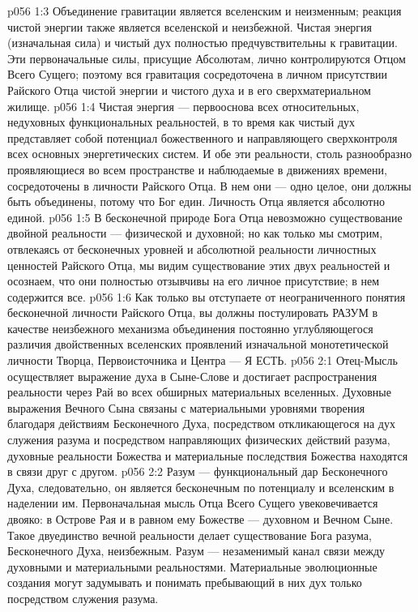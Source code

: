 \vs p056 1:3 Объединение гравитации является вселенским и неизменным; реакция чистой энергии также является вселенской и неизбежной. Чистая энергия (изначальная сила) и чистый дух полностью предчувствительны к гравитации. Эти первоначальные силы, присущие Абсолютам, лично контролируются Отцом Всего Сущего; поэтому вся гравитация сосредоточена в личном присутствии Райского Отца чистой энергии и чистого духа и в его сверхматериальном жилище.
\vs p056 1:4 \pc Чистая энергия --- первооснова всех относительных, недуховных функциональных реальностей, в то время как чистый дух представляет собой потенциал божественного и направляющего сверхконтроля всех основных энергетических систем. И обе эти реальности, столь разнообразно проявляющиеся во всем пространстве и наблюдаемые в движениях времени, сосредоточены в личности Райского Отца. В нем они --- одно целое, они должны быть объединены, потому что Бог един. Личность Отца является абсолютно единой.
\vs p056 1:5 В бесконечной природе Бога Отца невозможно существование двойной реальности --- физической и духовной; но как только мы смотрим, отвлекаясь от бесконечных уровней и абсолютной реальности личностных ценностей Райского Отца, мы видим существование этих двух реальностей и осознаем, что они полностью отзывчивы на его личное присутствие; в нем содержится все.
\vs p056 1:6 Как только вы отступаете от неограниченного понятия бесконечной личности Райского Отца, вы должны постулировать РАЗУМ в качестве неизбежного механизма объединения постоянно углубляющегося различия двойственных вселенских проявлений изначальной монотетической личности Творца, Первоисточника и Центра --- Я ЕСТЬ.
\vs p056 2:1 Отец\hyp{}Мысль осуществляет выражение духа в Сыне\hyp{}Слове и достигает распространения реальности через Рай во всех обширных материальных вселенных. Духовные выражения Вечного Сына связаны с материальными уровнями творения благодаря действиям Бесконечного Духа, посредством откликающегося на дух служения разума и посредством направляющих физических действий разума, духовные реальности Божества и материальные последствия Божества находятся в связи друг с другом.
\vs p056 2:2 Разум --- функциональный дар Бесконечного Духа, следовательно, он является бесконечным по потенциалу и вселенским в наделении им. Первоначальная мысль Отца Всего Сущего увековечивается двояко: в Острове Рая и в равном ему Божестве --- духовном и Вечном Сыне. Такое двуединство вечной реальности делает существование Бога разума, Бесконечного Духа, неизбежным. Разум --- незаменимый канал связи между духовными и материальными реальностями. Материальные эволюционные создания могут задумывать и понимать пребывающий в них дух только посредством служения разума.
